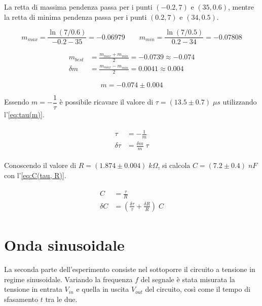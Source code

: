 \documentclass[11pt, a4paper]{article}
\numberwithin{equation}{section} %
\begin{document}
La retta di massima pendenza passa per i punti \((-0.2, 7)\) e \((35, 0.6)\), mentre la retta di minima pendenza passa per i punti \((0.2, 7)\) e \((34, 0.5)\).

\begin{equation*}
    m_{max} = \frac{\ln(7/0.6)}{- 0.2 - 35} = - 0.06979
    \qquad
    m_{min} = \frac{\ln(7/0.5)}{0.2 - 34} = - 0.07808
\end{equation*}

\begin{align*}
    m_{best} &= \frac{m_{max} + m_{min}}{2} = - 0.0739 \approx - 0.074 \\
    \delta m &= \frac{m_{max} - m_{min}}{2} = 0.0041 \approx 0.004
\end{align*}

\begin{equation}
    m = - 0.074 \pm 0.004
\end{equation}

\newpage

Essendo \(m = - \dfrac{1}{\tau}\) è possibile ricavare il valore di $\tau = (13.5 \pm 0.7) \; \mu s$ utilizzando l'\autoref{eq:tau(m)}.

\begin{align} \label{eq:tau(m)}
    \begin{split}
        \tau &= - \frac{1}{m} \\
        \delta \tau &= \frac{\delta m}{m} \; \tau
    \end{split}
\end{align}

Conoscendo il valore di \(R = (1.874 \pm 0.004) \; \unit{k\Omega}\), si calcola $C = (7.2 \pm 0.4) \; nF$ con l'\autoref{eq:C(tau, R)}.

\begin{align} \label{eq:C(tau, R)}
    \begin{split}
        C &= \frac{\tau}{R} \\
        \delta C &= \left(\frac{\delta \tau}{\tau} + \frac{\delta R}{R}\right) \; C
    \end{split}
\end{align}

\section{Onda sinusoidale}

La seconda parte dell'esperimento consiste nel sottoporre il circuito a tensione in regime sinusoidale. Variando la frequenza $f$ del segnale è stata misurata la tensione in entrata $V_{in}$ e quella in uscita $V_{out}$ del circuito, così come il tempo di sfasamento $t$ tra le due.
\end{document}
